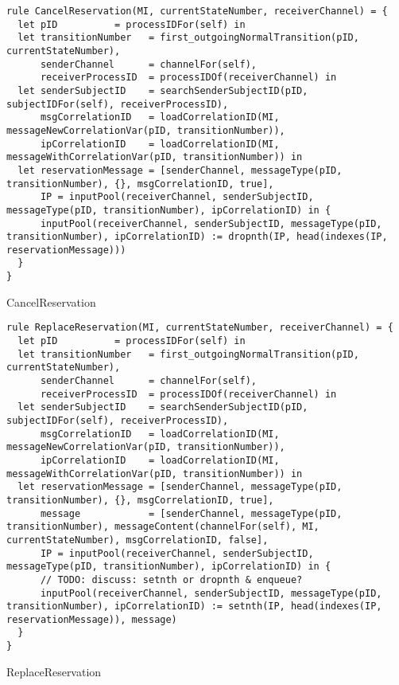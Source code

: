 \begin{listing}[H]
\begin{verbatim}
rule CancelReservation(MI, currentStateNumber, receiverChannel) = {
  let pID          = processIDFor(self) in
  let transitionNumber   = first_outgoingNormalTransition(pID, currentStateNumber),
      senderChannel      = channelFor(self),
      receiverProcessID  = processIDOf(receiverChannel) in
  let senderSubjectID    = searchSenderSubjectID(pID, subjectIDFor(self), receiverProcessID),
      msgCorrelationID   = loadCorrelationID(MI, messageNewCorrelationVar(pID, transitionNumber)),
      ipCorrelationID    = loadCorrelationID(MI, messageWithCorrelationVar(pID, transitionNumber)) in
  let reservationMessage = [senderChannel, messageType(pID, transitionNumber), {}, msgCorrelationID, true],
      IP = inputPool(receiverChannel, senderSubjectID, messageType(pID, transitionNumber), ipCorrelationID) in {
      inputPool(receiverChannel, senderSubjectID, messageType(pID, transitionNumber), ipCorrelationID) := dropnth(IP, head(indexes(IP, reservationMessage)))
  }
}
\end{verbatim}
\caption{CancelReservation}
\label{lst:asm:CancelReservation}
\end{listing}




\begin{listing}[H]
\begin{verbatim}
rule ReplaceReservation(MI, currentStateNumber, receiverChannel) = {
  let pID          = processIDFor(self) in
  let transitionNumber   = first_outgoingNormalTransition(pID, currentStateNumber),
      senderChannel      = channelFor(self),
      receiverProcessID  = processIDOf(receiverChannel) in
  let senderSubjectID    = searchSenderSubjectID(pID, subjectIDFor(self), receiverProcessID),
      msgCorrelationID   = loadCorrelationID(MI, messageNewCorrelationVar(pID, transitionNumber)),
      ipCorrelationID    = loadCorrelationID(MI, messageWithCorrelationVar(pID, transitionNumber)) in
  let reservationMessage = [senderChannel, messageType(pID, transitionNumber), {}, msgCorrelationID, true],
      message            = [senderChannel, messageType(pID, transitionNumber), messageContent(channelFor(self), MI, currentStateNumber), msgCorrelationID, false],
      IP = inputPool(receiverChannel, senderSubjectID, messageType(pID, transitionNumber), ipCorrelationID) in {
      // TODO: discuss: setnth or dropnth & enqueue?
      inputPool(receiverChannel, senderSubjectID, messageType(pID, transitionNumber), ipCorrelationID) := setnth(IP, head(indexes(IP, reservationMessage)), message)
  }
}
\end{verbatim}
\caption{ReplaceReservation}
\label{lst:asm:ReplaceReservation}
\end{listing}





